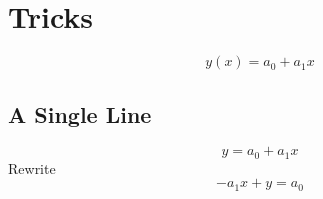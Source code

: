\chapter{Tricks}


  \begin{equation*}   %
      y(x) = a_{0} + a_{1} x
  \end{equation*}

\section{A Single Line}  %
  \begin{equation}   %
      y = a_{0} + a_{1} x
   \label{eq:myline}
  \end{equation}
Rewrite
  \begin{equation*}   %
      -a_{1} x + y = a_{0}
  \end{equation*}

